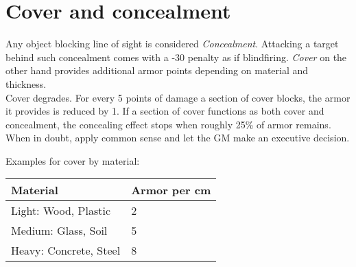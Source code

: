 \section{Cover and concealment}
Any object blocking line of sight is considered \emph{Concealment}. Attacking a target behind such concealment comes with a -30 penalty as if blindfiring.
\emph{Cover} on the other hand provides additional armor points depending on material and thickness.
\\%
Cover degrades. For every 5 points of damage a section of cover blocks, the armor it provides is reduced by 1. If a section of cover functions as both cover and concealment, the concealing effect stops when roughly 25\% of armor remains. When in doubt, apply common sense and let the GM make an executive decision.
\par
\needspace{30mm}
Examples for cover by material:
\par%
\vspace{-8mm}
\begin{tabular}{ll}
	Material & Armor per cm \\ \hline
	Light: Wood, Plastic & 2 \\
	Medium: Glass, Soil & 5 \\
	Heavy: Concrete, Steel & 8
\end{tabular}
